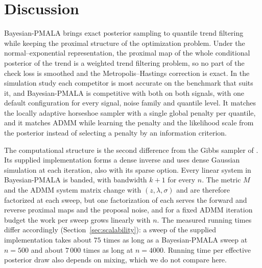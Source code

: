 
\section{Discussion}
\label{sec:discussion}

Bayesian-PMALA brings exact posterior sampling to quantile trend filtering while keeping the proximal structure of the optimization problem. Under the normal--exponential representation, the proximal map of the whole conditional posterior of the trend is a weighted trend filtering problem, so no part of the check loss is smoothed and the Metropolis--Hastings correction is exact. In the simulation study each competitor is most accurate on the benchmark that suits it, and Bayesian-PMALA is competitive with both on both signals, with one default configuration for every signal, noise family and quantile level. It matches the locally adaptive horseshoe sampler with a single global penalty per quantile, and it matches ADMM while learning the penalty and the likelihood scale from the posterior instead of selecting a penalty by an information criterion.

The computational structure is the second difference from the Gibbs sampler of \citet{onizuka2024fast}. Its supplied implementation forms a dense inverse and uses dense Gaussian simulation at each iteration, also with its sparse option. Every linear system in Bayesian-PMALA is banded, with bandwidth $k+1$ for every $n$. The metric $M$ and the ADMM system matrix change with $(z, \lambda, \sigma)$ and are therefore factorized at each sweep, but one factorization of each serves the forward and reverse proximal maps and the proposal noise, and for a fixed ADMM iteration budget the work per sweep grows linearly with $n$. The measured running times differ accordingly (Section~\ref{sec:scalability}): a sweep of the supplied implementation takes about $75$ times as long as a Bayesian-PMALA sweep at $n = 500$ and about $7\,000$ times as long at $n = 4000$. Running time per effective posterior draw also depends on mixing, which we do not compare here.

